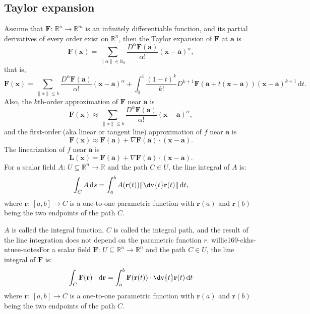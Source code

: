 \documentclass[a4paper,12pt]{report}
\begin{document}
\begin{itemize}
\begin{itemize}
\subsection{Taylor expansion}
Assume that $\mathbf{F}:\,\mathbb{R}^n\to\mathbb{R}^m$ is an infinitely differentiable function, and its partial derivatives of every order exist on $\mathbb{R}^n$, then the Taylor expansion of $\mathbf{F}$ at $\mathbf{a}$ is
\[\mathbf{F}(\mathbf{x}) = \sum_{\|\alpha\|\in\mathbb{N}_0} \frac{D^\alpha \mathbf{F}(\mathbf{a})}{\alpha!} (\mathbf{x} - \mathbf{a})^\alpha,\]
that is,
\[\mathbf{F}(\mathbf{x}) = \sum_{\|\alpha\|\leq k} \frac{D^\alpha \mathbf{F}(\mathbf{a})}{\alpha!} (\mathbf{x} - \mathbf{a})^\alpha+\int_0^1\frac{(1-t)^k}{k!} D^{k+1}\mathbf{F}(\mathbf{a} + t(\mathbf{x} - \mathbf{a})) (\mathbf{x} - \mathbf{a})^{k+1} \, \mathrm{d}t.\]
Also, the $k$th-order approximation of $\mathbf{F}$ near $\mathbf{a}$ is
\[\mathbf{F}(\mathbf{x}) \approx \sum_{\|\alpha\|\leq k} \frac{D^\alpha \mathbf{F}(\mathbf{a})}{\alpha!} (\mathbf{x} - \mathbf{a})^\alpha,\]
and the first-order (aka linear or tangent line) approximation of $f$ near $\mathbf{a}$ is
\[\mathbf{F}(\mathbf{x}) \approx \mathbf{F}(\mathbf{a}) + \nabla \mathbf{F}(\mathbf{a}) \cdot (\mathbf{x} - \mathbf{a}).\]
The linearization of $f$ near $\mathbf{a}$ is
\[\mathbf{L}(\mathbf{x})= \mathbf{F}(\mathbf{a}) + \nabla \mathbf{F}(\mathbf{a}) \cdot (\mathbf{x} - \mathbf{a}).\]
For a scalar field $A : \,U\subseteq \mathbb {R} ^{n}\to \mathbb {R}$ and the path $C \in U$, the line integral of $A$ is: 
\[\int _{C}A\,\mathrm {d} s=\int _{a}^{b}A(\mathbf{r}(t))\|\dv{t}\mathbf {r} (t)\|\,\mathrm {d} t,\]
where $\mathbf{r}:\, [a, b] \to C$ is a one-to-one parametric function with $\mathbf{r}(a)$ and $\mathbf{r}(b)$ being the two endpoints of the path $C$. 

$A$ is called the integral function, $C$ is called the integral path, and the result of the line integration does not depend on the parametric function $r$.
willie169-ckhs-ntuee-notesFor a scalar field $\mathbf{F}: \,U\subseteq \mathbb {R} ^{n}\to \mathbb {R}^n$ and the path $C \in U$, the line integral of $\mathbf{F}$ is: 
\[\int _{C}\mathbf {F} (\mathbf {r} )\cdot \,\mathrm {d} \mathbf{r}=\int _{a}^{b}\mathbf {F} (\mathbf {r} (t))\cdot \dv{t}\mathbf {r} (t)\,\mathrm {d} t\]
where $\mathbf{r}:\, [a, b] \to C$ is a one-to-one parametric function with $\mathbf{r}(a)$ and $\mathbf{r}(b)$ being the two endpoints of the path $C$. 


\end{itemize}
\end{itemize}
\end{document}
